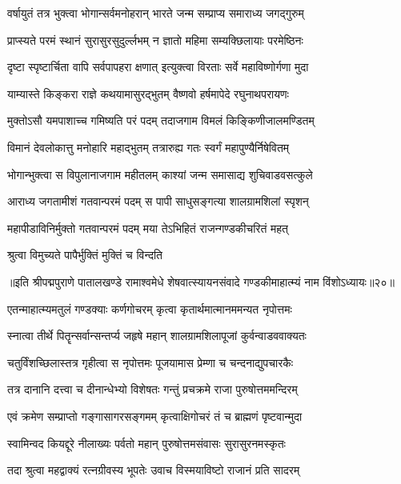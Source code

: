 \twolineshloka
{वर्षायुतं तत्र भुक्त्वा भोगान्सर्वमनोहरान्}
{भारते जन्म सम्प्राप्य समाराध्य जगद्गुरुम्}%

\twolineshloka
{प्राप्स्यते परमं स्थानं सुरासुरसुदुर्ल्लभम्}
{न ज्ञातो महिमा सम्यक्छिलायाः परमेष्ठिनः}%

\twolineshloka
{दृष्टा स्पृष्टार्चिता वापि सर्वपापहरा क्षणात्}
{इत्युक्त्वा विरताः सर्वे महाविष्णोर्गणा मुदा}%

\twolineshloka
{याम्यास्ते किङ्करा राज्ञे कथयामासुरद्भुतम्}
{वैष्णवो हर्षमापेदे रघुनाथपरायणः}%

\twolineshloka
{मुक्तोऽसौ यमपाशाच्च गमिष्यति परं पदम्}
{तदाजगाम विमलं किङ्किणीजालमण्डितम्}%

\twolineshloka
{विमानं देवलोकात्तु मनोहारि महाद्भुतम्}
{तत्रारुह्य गतः स्वर्गं महापुण्यैर्निषेवितम्}%

\twolineshloka
{भोगान्भुक्त्वा स विपुलानाजगाम महीतलम्}
{काश्यां जन्म समासाद्य शुचिवाडवसत्कुले}%

\twolineshloka
{आराध्य जगतामीशं गतवान्परमं पदम्}
{स पापी साधुसङ्गत्या शालग्रामशिलां स्पृशन्}%

\twolineshloka
{महापीडाविनिर्मुक्तो गतवान्परमं पदम्}
{मया तेऽभिहितं राजन्गण्डकीचरितं महत्}%

\onelineshloka
{श्रुत्वा विमुच्यते पापैर्भुक्तिं मुक्तिं च विन्दति}%

{॥इति श्रीपद्मपुराणे पातालखण्डे रामाश्वमेधे शेषवात्स्यायनसंवादे गण्डकीमाहात्म्यं नाम विंशोऽध्यायः॥२०॥}

\resetShloka


\twolineshloka
{एतन्माहात्म्यमतुलं गण्डक्याः कर्णगोचरम्}
{कृत्वा कृतार्थमात्मानममन्यत नृपोत्तमः}%

\twolineshloka
{स्नात्वा तीर्थे पितॄन्सर्वान्सन्तर्प्य जहृषे महान्}
{शालग्रामशिलापूजां कुर्वन्वाडववाक्यतः}%

\twolineshloka
{चतुर्विंशच्छिलास्तत्र गृहीत्वा स नृपोत्तमः}
{पूजयामास प्रेम्णा च चन्दनाद्युपचारकैः}%

\twolineshloka
{तत्र दानानि दत्त्वा च दीनान्धेभ्यो विशेषतः}
{गन्तुं प्रचक्रमे राजा पुरुषोत्तममन्दिरम्}%

\twolineshloka
{एवं क्रमेण सम्प्राप्तो गङ्गासागरसङ्गमम्}
{कृत्वाक्षिगोचरं तं च ब्राह्मणं पृष्टवान्मुदा}%

\twolineshloka
{स्वामिन्वद कियद्दूरे नीलाख्यः पर्वतो महान्}
{पुरुषोत्तमसंवासः सुरासुरनमस्कृतः}%

\twolineshloka
{तदा श्रुत्वा महद्वाक्यं रत्नग्रीवस्य भूपतेः}
{उवाच विस्मयाविष्टो राजानं प्रति सादरम्}%

